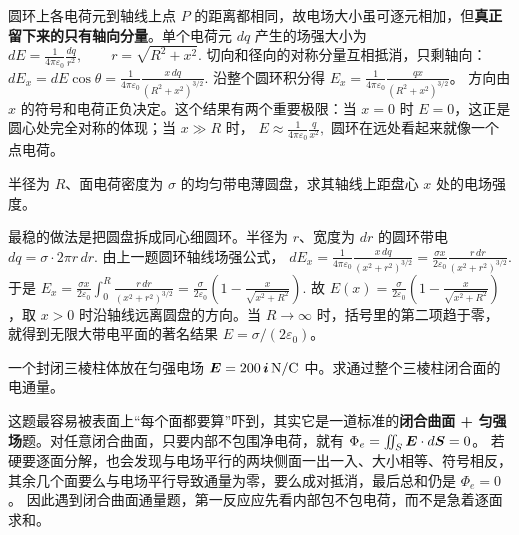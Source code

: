 \documentclass[lang=cn,11pt]{elegantbook}
\begin{document}
\begin{solution}
圆环上各电荷元到轴线上点 \(P\) 的距离都相同，故电场大小虽可逐元相加，但\textbf{真正留下来的只有轴向分量}。单个电荷元 \(dq\) 产生的场强大小为
 \(dE=\frac{1}{4\pi\varepsilon_0}\frac{dq}{r^2}, \qquad r=\sqrt{R^2+x^2}.\) 
切向和径向的对称分量互相抵消，只剩轴向：
 \(dE_x=dE\cos\theta =\frac{1}{4\pi\varepsilon_0}\frac{x\,dq}{(R^2+x^2)^{3/2}}.\) 
沿整个圆环积分得 \(E_x=\frac{1}{4\pi\varepsilon_0}\frac{qx}{(R^2+x^2)^{3/2}}\)。
方向由 \(x\) 的符号和电荷正负决定。这个结果有两个重要极限：当 \(x=0\) 时 \(E=0\)，这正是圆心处完全对称的体现；当 \(x\gg R\) 时，
 \(E\approx \frac{1}{4\pi\varepsilon_0}\frac{q}{x^2},\) 
圆环在远处看起来就像一个点电荷。
\end{solution}

\begin{exercise}[均匀带电圆盘轴线上的场强]
半径为 \(R\)、面电荷密度为 \(\sigma\) 的均匀带电薄圆盘，求其轴线上距盘心 \(x\) 处的电场强度。
\end{exercise}

\begin{solution}
最稳的做法是把圆盘拆成同心细圆环。半径为 \(r\)、宽度为 \(dr\) 的圆环带电
 \(dq=\sigma\cdot 2\pi r\,dr.\) 
由上一题圆环轴线场强公式，
 \(dE_x=\frac{1}{4\pi\varepsilon_0} \frac{x\,dq}{(x^2+r^2)^{3/2}} =\frac{\sigma x}{2\varepsilon_0} \frac{r\,dr}{(x^2+r^2)^{3/2}}.\) 
于是
 \(E_x=\frac{\sigma x}{2\varepsilon_0} \int_0^R\frac{r\,dr}{(x^2+r^2)^{3/2}} =\frac{\sigma}{2\varepsilon_0}\left(1-\frac{x}{\sqrt{x^2+R^2}}\right).\) 
故 \(E(x)=\frac{\sigma}{2\varepsilon_0}\left(1-\frac{x}{\sqrt{x^2+R^2}}\right)\)，取 \(x>0\) 时沿轴线远离圆盘的方向。当 \(R\to\infty\) 时，括号里的第二项趋于零，就得到无限大带电平面的著名结果 \(E=\sigma/(2\varepsilon_0)\)。
\end{solution}

\begin{exercise}[匀强电场中三棱柱的电通量]
一个封闭三棱柱体放在匀强电场 \(\vb*{E}=200\,\vb*{i}\,\mathrm{N/C}\) 中。求通过整个三棱柱闭合面的电通量。
\end{exercise}

\begin{solution}
这题最容易被表面上“每个面都要算”吓到，其实它是一道标准的\textbf{闭合曲面 + 匀强场}题。对任意闭合曲面，只要内部不包围净电荷，就有
\(\Phi_e=\iint_S \vb*{E}\cdot d\vb*{S}=0\)。
若硬要逐面分解，也会发现与电场平行的两块侧面一出一入、大小相等、符号相反，其余几个面要么与电场平行导致通量为零，要么成对抵消，最后总和仍是
\(\Phi_e=0\)。
因此遇到闭合曲面通量题，第一反应应先看内部包不包电荷，而不是急着逐面求和。
\end{solution}
\end{document}
